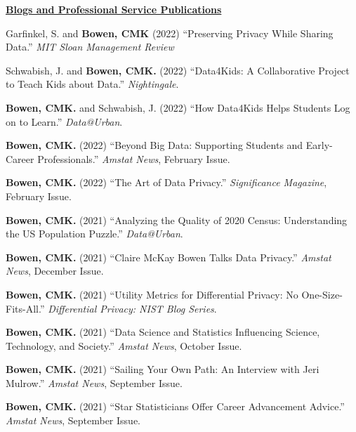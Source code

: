 \documentclass[11pt, letterpaper, roman]{moderncv} %
\begin{document}
\vspace{6pt}
\noindent\underline{\textbf{Blogs and Professional Service Publications}}
\vspace{4pt}
\begin{etaremune}[topsep=0pt, itemsep=3pt, partopsep=0pt, parsep=0pt]
    \item Garfinkel, S. and \textbf{Bowen, CMK} (2022) ``Preserving Privacy While Sharing Data.'' \textit{MIT Sloan Management Review}

    \item Schwabish, J. and \textbf{Bowen, CMK.} (2022) ``Data4Kids: A Collaborative Project to Teach Kids about Data.'' \textit{Nightingale}.
    
    \item \textbf{Bowen, CMK.} and Schwabish, J. (2022) ``How Data4Kids Helps Students Log on to Learn.'' \textit{Data@Urban}.

    \item \textbf{Bowen, CMK.} (2022) ``Beyond Big Data: Supporting Students and Early-Career Professionals.'' \textit{Amstat News}, February Issue.
    
    \item \textbf{Bowen, CMK.} (2022) ``The Art of Data Privacy.'' \textit{Significance Magazine}, February Issue.
    
    \item \textbf{Bowen, CMK.} (2021) ``Analyzing the Quality of 2020 Census: Understanding the US Population Puzzle.'' \textit{Data@Urban}.

    \item \textbf{Bowen, CMK.} (2021) ``Claire McKay Bowen Talks Data Privacy.'' \textit{Amstat News}, December Issue.
    
    \item \textbf{Bowen, CMK.} (2021) ``Utility Metrics for Differential Privacy: No One-Size-Fits-All.'' \textit{Differential Privacy: NIST Blog Series}.
    
    \item \textbf{Bowen, CMK.} (2021) ``Data Science and Statistics Influencing Science, Technology, and Society.'' \textit{Amstat News}, October Issue.
    
    \item \textbf{Bowen, CMK.} (2021) ``Sailing Your Own Path: An Interview with Jeri Mulrow.'' \textit{Amstat News}, September Issue.

    \item \textbf{Bowen, CMK.} (2021) ``Star Statisticians Offer Career Advancement Advice.'' \textit{Amstat News}, September Issue.    
    

\end{etaremune}
\end{document}
